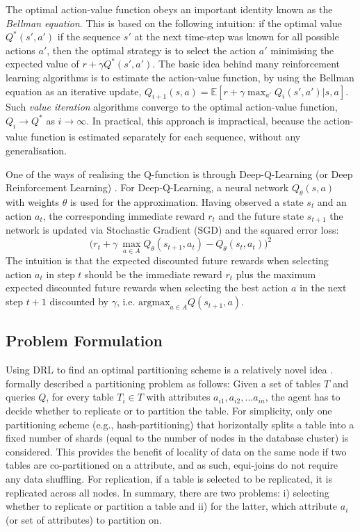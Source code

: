 The optimal action-value function obeys an important identity known as the \textit{Bellman equation}. This is based on the following intuition: if the optimal value $Q^*(s',a')$ if the sequence $s'$ at the next time-step was known for all possible actions $a'$, then the optimal strategy is to select the action $a'$ minimising the expected value of $r + \gamma Q^*(s',a')$.
The basic idea behind many reinforcement learning algorithms is to estimate the action-value function, by using the Bellman equation as an iterative update, $Q_{i+1}(s,a) = \mathbb{E}[r+\gamma \max_{a'}Q_i(s',a')| s,a]$. Such \textit{value iteration} algorithms converge to the optimal action-value function, $Q_i \xrightarrow[]{} Q^*$ as $i \xrightarrow[]{} \infty$\cite{sutton2018reinforcement}. In practical, this approach is impractical, because the action-value function is estimated separately for each sequence, without any generalisation. 

One of the ways of realising the Q-function is through Deep-Q-Learning (or Deep Reinforcement Learning) \cite{Zhu:2017:BTP:3127479.3128605}.  For Deep-Q-Learning, a neural network $Q_\theta(s,a)$ with weights $\theta$ is used for the approximation. Having observed a state $s_t$ and an action $a_t$, the corresponding immediate reward $r_t$ and the future state $s_{t+1}$ the network is updated via Stochastic Gradient (SGD) and the squared error loss:
\begin{equation}
    \bigg( r_t + \gamma\ \max_{a \in A} Q_\theta(s_{t+1},a_t) - Q_\theta(s_t, a_t) \bigg)^2
\end{equation}
The intuition is that the expected discounted future rewards when selecting action $a_t$ in step $t$ should be the immediate reward $r_t$ plus the maximum expected discounted future rewards when selecting the best action $a$ in the next step $t+1$ discounted by $\gamma$, i.e. $\text{argmax}_{a \in A} Q(s_{t+1},a)$.

\subsection{Problem Formulation}
Using DRL to find an optimal partitioning scheme is a relatively novel idea \cite{Hilprecht:2019:TLP:3329859.3329876, DBLP:conf/sigmod/DurandPPMBSSRB18}. \citeauthor{Hilprecht:2019:TLP:3329859.3329876} formally described a partitioning problem as follows: Given a set of tables $T$ and queries $Q$, for every table $T_i \in T$ with attributes $a_{i1}, a_{i2}, ...a_{in}$, the agent has to decide whether to replicate or to partition the table. For simplicity, only one partitioning scheme (e.g., hash-partitioning) that horizontally splits a table into a fixed number of shards (equal to the number of nodes in the database cluster) is considered. This provides the benefit of locality of data on the same node if two tables are co-partitioned on a attribute, and as such, equi-joins do not require any data shuffling. For replication, if a table is selected to be replicated, it is replicated across all nodes. In summary, there are two problems: i) selecting whether to replicate or partition a table and ii) for the latter, which attribute $a_i$ (or set of attributes) to partition on. 

